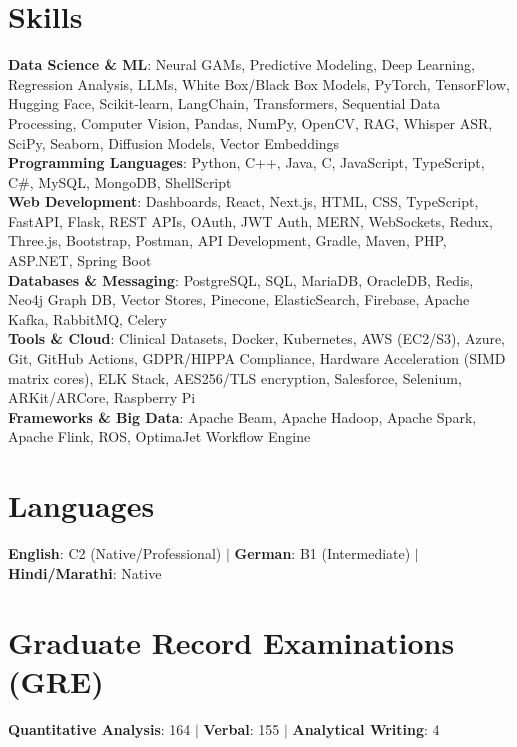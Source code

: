 \documentclass[10pt,a4paper]{article}
\begin{document}
\section{Skills}
\begin{itemize}[leftmargin=0.15in, label={}]
    \small{\item{
     \textbf{Data Science \& ML}{: Neural GAMs, Predictive Modeling, Deep Learning, Regression Analysis, LLMs, White Box/Black Box Models, PyTorch, TensorFlow, Hugging Face, Scikit-learn, LangChain, Transformers, Sequential Data Processing, Computer Vision, Pandas, NumPy, OpenCV, RAG, Whisper ASR, SciPy, Seaborn, Diffusion Models, Vector Embeddings} \\
     \textbf{Programming Languages}{: Python, C++, Java, C, JavaScript, TypeScript, C\#, MySQL, MongoDB, ShellScript} \\
     \textbf{Web Development}{: Dashboards, React, Next.js, HTML, CSS, TypeScript, FastAPI, Flask, REST APIs, OAuth, JWT Auth, MERN, WebSockets, Redux, Three.js, Bootstrap, Postman, API Development, Gradle, Maven, PHP, ASP.NET, Spring Boot} \\
     \textbf{Databases \& Messaging}{: PostgreSQL, SQL, MariaDB, OracleDB, Redis, Neo4j Graph DB, Vector Stores, Pinecone, ElasticSearch, Firebase, Apache Kafka, RabbitMQ, Celery} \\
     \textbf{Tools \& Cloud}{: Clinical Datasets, Docker, Kubernetes, AWS (EC2/S3), Azure, Git, GitHub Actions, GDPR/HIPPA Compliance, Hardware Acceleration (SIMD matrix cores), ELK Stack, AES256/TLS encryption, Salesforce, Selenium, ARKit/ARCore, Raspberry Pi} \\
     \textbf{Frameworks \& Big Data}{: Apache Beam, Apache Hadoop, Apache Spark, Apache Flink, ROS, OptimaJet Workflow Engine}
    }}
\end{itemize}

\section{Languages}
\begin{itemize}[leftmargin=0.15in, label={}]
    \small{\item{
     \textbf{English}{: C2 (Native/Professional)} $|$ \textbf{German}{: B1 (Intermediate)} $|$ \textbf{Hindi/Marathi}{: Native}
    }}
\end{itemize}

\section{Graduate Record Examinations (GRE)}
\begin{itemize}[leftmargin=0.15in, label={}]
    \small{\item{
     \textbf{Quantitative Analysis}{: 164} $|$ \textbf{Verbal}{: 155} $|$ \textbf{Analytical Writing}{: 4}
    }}
\end{itemize}
\end{document}
